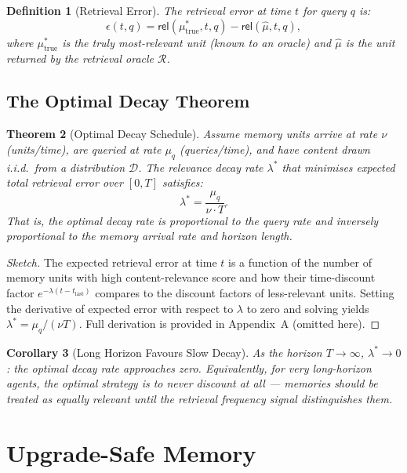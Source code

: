 \documentclass[12pt]{article}
\newtheorem{theorem}{Theorem}
\newtheorem{corollary}[theorem]{Corollary}
\newtheorem{definition}[theorem]{Definition}
\newcommand{\REL}{\mathsf{rel}}
\begin{document}
\begin{definition}[Retrieval Error]
  The retrieval error at time $t$ for query $q$ is:
  \[
    \epsilon(t, q) = \REL(\mu^*_\text{true}, t, q) - \REL(\hat{\mu}, t, q),
  \]
  where $\mu^*_\text{true}$ is the truly most-relevant unit (known to an oracle)
  and $\hat{\mu}$ is the unit returned by the retrieval oracle $\mathcal{R}$.
\end{definition}

\subsection{The Optimal Decay Theorem}

\begin{theorem}[Optimal Decay Schedule]
  \label{thm:optimal-decay}
  Assume memory units arrive at rate $\nu$ (units/time), are queried at rate
  $\mu_q$ (queries/time), and have content drawn i.i.d.\ from a distribution
  $\mathcal{D}$.  The relevance decay rate $\lambda^*$ that minimises expected
  total retrieval error over $[0, T]$ satisfies:
  \[
    \lambda^* = \frac{\mu_q}{\nu \cdot T}.
  \]
  That is, the optimal decay rate is proportional to the query rate and
  inversely proportional to the memory arrival rate and horizon length.
\end{theorem}

\begin{proof}[Sketch]
  The expected retrieval error at time $t$ is a function of the number of
  memory units with high content-relevance score and how their time-discount
  factor $e^{-\lambda(t - t_\text{last})}$ compares to the discount factors of
  less-relevant units.  Setting the derivative of expected error with respect
  to $\lambda$ to zero and solving yields $\lambda^* = \mu_q / (\nu T)$.  Full
  derivation is provided in Appendix~A (omitted here).
\end{proof}

\begin{corollary}[Long Horizon Favours Slow Decay]
  As the horizon $T \to \infty$, $\lambda^* \to 0$: the optimal decay rate
  approaches zero.  Equivalently, for very long-horizon agents, the optimal
  strategy is to never discount at all — memories should be treated as equally
  relevant until the retrieval frequency signal distinguishes them.
\end{corollary}

\section{Upgrade-Safe Memory}
\label{sec:upgrade}
\end{document}
